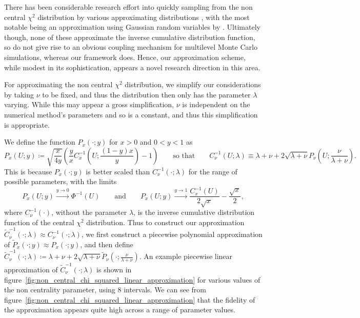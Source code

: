 \documentclass[manuscript,review]{acmart}
\begin{document}

There has been considerable research effort into quickly sampling from the non central $ \chi^2 $ distribution by various approximating distributions \citep{johnson1995continuous,sankaran1959non,abdel1954approximate,wilson1931distribution,hoaglin1977direct,shea1991algorithm,best1975algorithm,rice1968uniform}, with the most notable being an approximation using Gaussian random variables by \citet{abdel1954approximate}. Ultimately though, none of these approximate the inverse cumulative distribution function, so do not give rise to an obvious coupling mechanism for multilevel Monte Carlo simulations, whereas our framework does. Hence, our approximation scheme, while modest in its sophistication, appears a novel research direction in this area.

For approximating the non central $ \chi^2 $ distribution, we simplify our considerations by taking $ \nu $ to be fixed, and thus the distribution then only has the parameter $ \lambda $ varying. While this may appear a gross simplification, $ \nu $ is independent on the numerical method's parameters and so is a constant, and thus this simplification is appropriate.

We define the function $ P_x(\cdot;y) $ for $ x > 0 $ and $ 0 < y < 1  $ as 
\begin{equation*}
P_x(U;y) \coloneqq \sqrt{\dfrac{x}{4y}} \left( \dfrac{y}{x}  C^{-1}_{x}\left(U; \dfrac{(1 - y)x}{y}\right) - 1\right)
\qquad \text{so that} \qquad 
C^{-1}_{\nu}(U;\lambda) \equiv \lambda + \nu + 2 \sqrt{\lambda + \nu} P_\nu\left(U;\dfrac{\nu}{\lambda + \nu}\right).
\end{equation*}
This is because $ P_x(\cdot;y) $ is better scaled than $ C^{-1}_{\nu}(\cdot;\lambda) $ for the range of possible parameters, with the limits
\begin{equation*}
P_x(U;y) \xrightarrow{y\to 0} \Phi^{-1}(U) 
\qquad \text{and} \qquad 
P_x(U;y) \xrightarrow{y\to 1} \dfrac{C^{-1}_x(U)}{2\sqrt{x}} - \dfrac{\sqrt{x}}{2},
\end{equation*}
where $ C^{-1}_\nu(\cdot) $, without the parameter $ \lambda $, is the inverse cumulative distribution function of the central $ \chi^2 $ distribution. Thus to construct our approximation $ \tilde{C}^{-1}_{\nu}(\cdot;\lambda) \approx C^{-1}_{\nu}(\cdot;\lambda) $, we first construct a piecewise polynomial approximation of  $ \tilde{P}_x(\cdot;y) \approx P_x(\cdot;y) $, and then define 
$ \tilde{C}^{-1}_{\nu}(\cdot;\lambda) \coloneqq \lambda + \nu + 2 \sqrt{\lambda + \nu} \tilde{P}_\nu(\cdot;\tfrac{\nu}{\lambda + \nu}) $. An example piecewise linear approximation of $  \tilde{C}^{-1}_{\nu}(\cdot;\lambda) $ is shown in figure~\ref{fig:non_central_chi_squared_linear_approximation} for various values of the non centrality parameter, using 8 intervals. We can see from figure~\ref{fig:non_central_chi_squared_linear_approximation} that the fidelity of the approximation appears quite high across a range of parameter values. 
\end{document}
